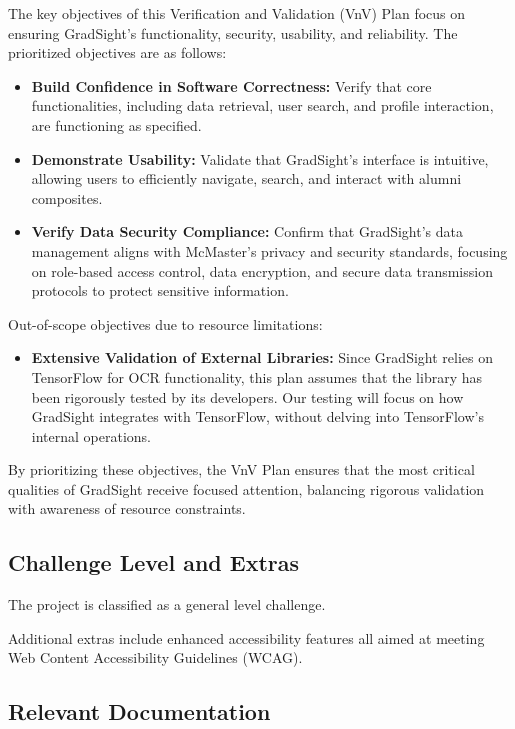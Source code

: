 \documentclass[12pt, titlepage]{article}
\begin{document}
The key objectives of this Verification and Validation (VnV) Plan focus on ensuring GradSight’s functionality, security, usability, and reliability. The prioritized objectives are as follows:

\begin{itemize}
    \item \textbf{Build Confidence in Software Correctness:} Verify that core functionalities, including data retrieval, user search, and profile interaction, are functioning as specified.
    \item \textbf{Demonstrate Usability:} Validate that GradSight’s interface is intuitive, allowing users to efficiently navigate, search, and interact with alumni composites.
    \item \textbf{Verify Data Security Compliance:} Confirm that GradSight’s data management aligns with McMaster’s privacy and security standards, focusing on role-based access control, data encryption, and secure data transmission protocols to protect sensitive information.
\end{itemize}

Out-of-scope objectives due to resource limitations:

\begin{itemize}
    \item \textbf{Extensive Validation of External Libraries:} Since GradSight relies on TensorFlow for OCR functionality, this plan assumes that the library has been rigorously tested by its developers. Our testing will focus on how GradSight integrates with TensorFlow, without delving into TensorFlow’s internal operations.
\end{itemize}

By prioritizing these objectives, the VnV Plan ensures that the most critical qualities of GradSight receive focused attention, balancing rigorous validation with awareness of resource constraints.

\subsection{Challenge Level and Extras}

The project is classified as a general level challenge.

Additional extras include enhanced accessibility features all aimed at meeting Web Content Accessibility Guidelines (WCAG).

\subsection{Relevant Documentation}
\end{document}
